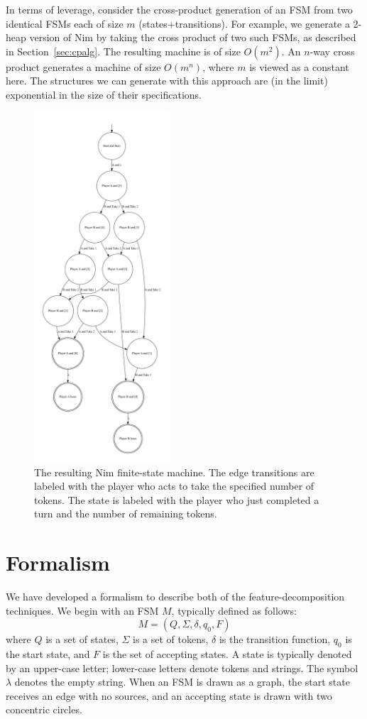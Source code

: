 \documentclass[sigplan,anonymous,review]{acmart}
\begin{document}
In terms of leverage, consider the cross-product generation of an FSM from two identical FSMs each of size $m$ (states+transitions).  For example, we generate a 2-heap version of Nim by taking the cross product of two such FSMs, as described in Section~\ref{sec:cpalg}.  The resulting machine is of size $O(m^{2})$.  An $n$-way cross product generates a machine of size $O(m^{n})$, where $m$ is viewed as a constant here.  The structures we can generate with this approach are (in the limit) exponential in the size of their specifications.

\begin{figure}
    \centering
    \includegraphics[width=0.45\textwidth]{figures/nimexample/nimFSM.pdf}
    \caption{The resulting Nim finite-state machine.  The edge transitions are labeled with the player who acts to take the specified number of tokens. The state is labeled with the player who just completed a turn and the number of remaining tokens.}
    \label{fig:nimFSM}
\end{figure}

\section{Formalism}\label{sec:formal}
We have developed a formalism to describe both of the feature-decomposition techniques. We begin with an FSM $M$, typically defined as follows: 
\[M = (Q, \Sigma, \delta, q_0, F)\]where $Q$ is a set of states, $\Sigma$ is a set of tokens, $\delta$ is the transition function, $q_0$ is the start state, and $F$ is the set of accepting states.  A state is typically denoted by an upper-case letter;  lower-case letters denote tokens and strings.  The symbol $\lambda$ denotes the empty string.  When an FSM is drawn as a graph, the start state receives an edge with no sources, and an accepting state is drawn with two concentric circles. 
\end{document}
